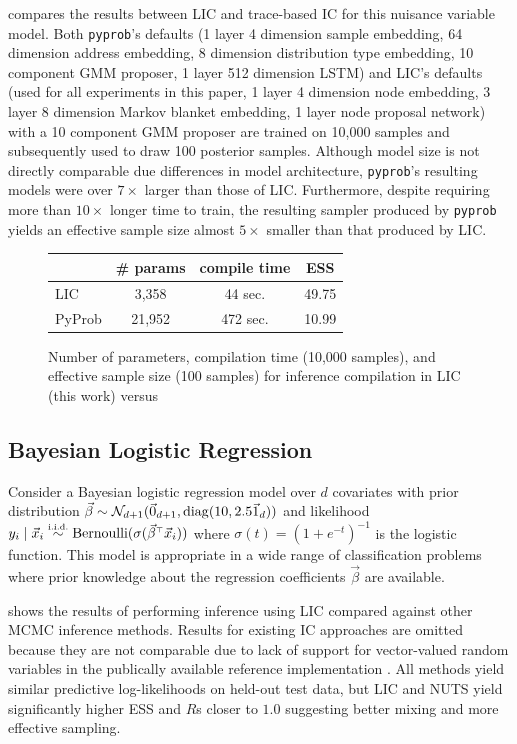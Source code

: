 \documentclass[thesis.tex]{subfiles}
\begin{document}
 compares the results between LIC and trace-based IC
\citep{le2017inference} for this nuisance variable model. Both \texttt{pyprob}'s
defaults (1 layer 4 dimension sample embedding, 64 dimension address
embedding, 8 dimension distribution type embedding, 10 component GMM
proposer, 1 layer 512 dimension LSTM) and LIC's defaults (used for all
experiments in this paper, 1 layer 4 dimension node embedding, 3 layer 8
dimension Markov blanket embedding, 1 layer node proposal network) with a 10
component GMM proposer are trained on 10,000 samples and subsequently used to
draw 100 posterior samples. Although model size is not directly comparable due
differences in model architecture, \texttt{pyprob}'s resulting models were over $7\times$
larger than those of LIC. Furthermore, despite requiring more than $10\times$ longer
time to train, the resulting sampler produced by \texttt{pyprob} yields
an effective sample size almost $5\times$ smaller than that produced by LIC.
\begin{figure}
  \centering
  \begin{tabular}{lccc}
    \toprule
           & \# params & compile time & ESS   \\
    \midrule
    LIC    & 3,358     & 44 sec.      & 49.75 \\
    PyProb & 21,952    & 472 sec.     & 10.99 \\
    \bottomrule
  \end{tabular}
  \caption{Number of parameters, compilation time (10,000 samples), and effective sample size (100 samples)
    for inference compilation in LIC (this work)
    versus \citep{pyprob2020}
  }\label{fig:nuisance}
\end{figure}

\subsection{Bayesian Logistic Regression}
\label{ssec:blr}

Consider a Bayesian logistic regression model over $d$ covariates
with prior distribution 
$\vec{\beta} \sim \mathcal{N}_{d+1}(\vec{0}_{d+1}, \operatorname*{\mathop{\mathrm{diag}}}(10, 2.5\vec{1}_{d}))$
and likelihood $y_i \mid \vx_i \simiid \text{Bernoulli}(\sigma(\vec{\beta}^\top \vx_i))$
where $\sigma(t) = (1 + e^{-t})^{-1}$ is the logistic function.
This model is appropriate in a wide range of classification problems where prior
knowledge about the regression coefficients $\vec{\beta}$ are available.

 shows the results of performing inference using LIC compared
against other MCMC inference methods. Results for existing IC approaches
\citep{le2017inference} are omitted because they are not comparable due to
lack of support for vector-valued random variables in the publically
available reference implementation \citep{pyprob2020}. All methods yield
similar predictive log-likelihoods on held-out test data, but LIC and NUTS
yield significantly higher ESS and $\widehat{R}$s closer to $1.0$ suggesting
better mixing and more effective sampling.
\end{document}
